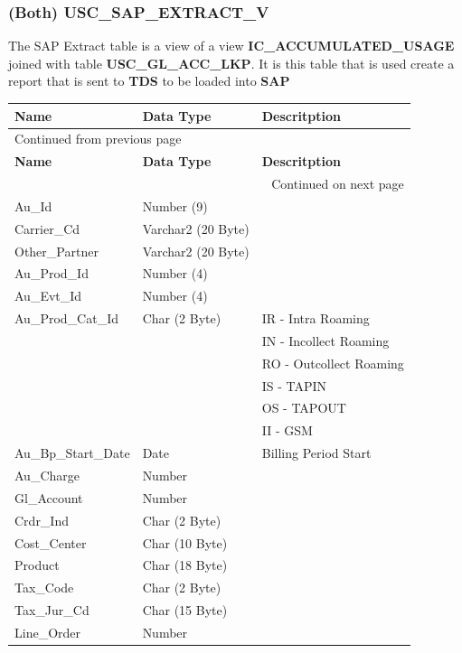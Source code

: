 \documentclass[12pt,twoside]{article}
\begin{document}
\subsubsection{(Both) USC\_SAP\_EXTRACT\_V}
\label{sec:orgheadline138}
The SAP Extract table is a view of a view \textbf{IC\_ACCUMULATED\_USAGE} joined with table \textbf{USC\_GL\_ACC\_LKP}. It is this table that is used create a report that is sent to \textbf{TDS} to be loaded into \textbf{SAP}
\footnotesize

\begin{longtable}{l|l|l}
\hline
\textbf{Name} & \textbf{Data Type} & \textbf{Descritption}\\
\hline
\endfirsthead
\multicolumn{3}{l}{Continued from previous page} \\
\hline

\textbf{Name} & \textbf{Data Type} & \textbf{Descritption} \\

\hline
\endhead
\hline\multicolumn{3}{r}{Continued on next page} \\
\endfoot
\endlastfoot
\hline
Au\_Id & Number (9) & \\
Carrier\_Cd & Varchar2 (20 Byte) & \\
Other\_Partner & Varchar2 (20 Byte) & \\
Au\_Prod\_Id & Number (4) & \\
Au\_Evt\_Id & Number (4) & \\
Au\_Prod\_Cat\_Id & Char (2 Byte) & IR - Intra Roaming\\
&  & IN - Incollect Roaming\\
&  & RO - Outcollect Roaming\\
&  & IS - TAPIN\\
&  & OS - TAPOUT\\
&  & II - GSM\\
Au\_Bp\_Start\_Date & Date & Billing Period Start\\
Au\_Charge & Number & \\
Gl\_Account & Number & \\
Crdr\_Ind & Char (2 Byte) & \\
Cost\_Center & Char (10 Byte) & \\
Product & Char (18 Byte) & \\
Tax\_Code & Char (2 Byte) & \\
Tax\_Jur\_Cd & Char (15 Byte) & \\
Line\_Order & Number & \\
\hline
\end{longtable}
\normalsize
\end{document}
